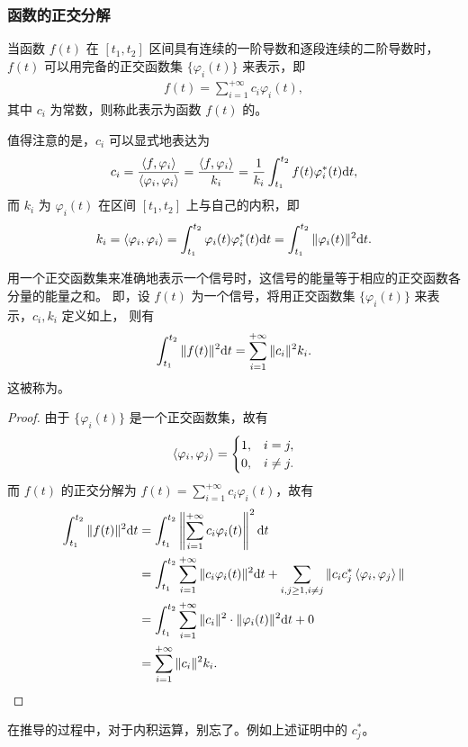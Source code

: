 \subsubsection{函数的正交分解}

\begin{definition}[函数的正交分解]
    当函数 $f(t)$ 在 $[t_1, t_2]$ 区间具有连续的一阶导数和逐段连续的二阶导数时，
    $f(t)$ 可以用完备的正交函数集 $\{\varphi_i(t)\}$ 来表示，即
    \begin{align*}
        f(t) = \sum_{i = 1}^{+\infty}c_i\varphi_i(t),
    \end{align*}
    其中 $c_i$ 为常数，则称此表示为函数 $f(t)$ 的。

    值得注意的是，$c_i$ 可以显式地表达为
    \begin{align*}
        c_i = \frac{\left\langle f, \varphi_i\right\rangle}{\left\langle\varphi_i, \varphi_i\right\rangle}
            = \frac{\left\langle f, \varphi_i\right\rangle}{k_i}
            = \frac{1}{k_i}\int_{t_1}^{t_2}f(t)\varphi_i^*(t)\mathrm{d}t,
    \end{align*}
    而 $k_i$ 为 $\varphi_i(t)$ 在区间 $[t_1, t_2]$ 上与自己的内积，即
    \begin{align*}
        k_i = \left\langle\varphi_i, \varphi_i\right\rangle = \int_{t_1}^{t_2}\varphi_i(t)\varphi_i^*(t)\mathrm{d}t
        = \int_{t_1}^{t_2}\|\varphi_i(t)\|^2\mathrm{d}t.
    \end{align*}
\end{definition}

\begin{theorem}[帕斯瓦尔定理]
    用一个正交函数集来准确地表示一个信号时，这信号的能量等于相应的正交函数各分量的能量之和。
    即，设 $f(t)$ 为一个信号，将用正交函数集 $\{\varphi_i(t)\}$ 来表示，$c_i, k_i$ 定义如上，
    则有
    \begin{align*}
        \int_{t_1}^{t_2}\|f(t)\|^2\mathrm{d}t = \sum_{i = 1}^{+\infty}\|c_i\|^2k_i.
    \end{align*}
    这被称为。
\end{theorem}

\begin{proof}
    由于 $\{\varphi_i(t)\}$ 是一个正交函数集，故有
    \begin{align*}
        \left\langle\varphi_i, \varphi_j\right\rangle = \begin{cases}
            1, & i = j, \\
            0, & i \neq j.
        \end{cases}
    \end{align*}
    而 $f(t)$ 的正交分解为 $f(t) = \sum_{i = 1}^{+\infty}c_i\varphi_i(t)$，故有
    \begin{align*}
        \int_{t_1}^{t_2}\|f(t)\|^2\mathrm{d}t & = \int_{t_1}^{t_2}\left\|\sum_{i = 1}^{+\infty}c_i\varphi_i(t)\right\|^2\mathrm{d}t \\
        & = \int_{t_1}^{t_2}\sum_{i = 1}^{+\infty}\|c_i\varphi_i(t)\|^2\mathrm{d}t
            + \sum_{i, j \ge 1, i \neq j}\|c_ic_j^*\left\langle\varphi_i, \varphi_j\right\rangle\| \\
        & = \int_{t_1}^{t_2}\sum_{i = 1}^{+\infty}\|c_i\|^2\cdot \|\varphi_i(t)\|^2\mathrm{d}t + 0 \\
        & = \sum_{i = 1}^{+\infty}\|c_i\|^2k_i.
    \end{align*}
\end{proof}

\begin{note}
    在推导的过程中，对于内积运算，别忘了。例如上述证明中的 $c_j^*$。
\end{note}
